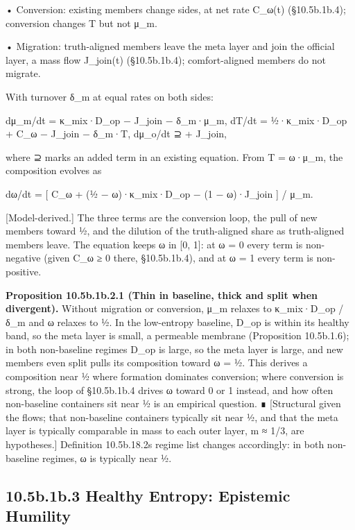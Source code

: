 \documentclass[
]{article}
\begin{document}
• Conversion: existing members change sides, at net rate C\_ω(t)
(§10.5b.1b.4); conversion changes T but not μ\_m.

• Migration: truth-aligned members leave the meta layer and join the
official layer, a mass flow J\_join(t) (§10.5b.1b.4); comfort-aligned
members do not migrate.

With turnover δ\_m at equal rates on both sides:

dμ\_m/dt = κ\_mix·D\_op − J\_join − δ\_m·μ\_m, dT/dt = ½·κ\_mix·D\_op +
C\_ω − J\_join − δ\_m·T, dμ\_o/dt ⊇ + J\_join,

where ⊇ marks an added term in an existing equation. From T = ω·μ\_m,
the composition evolves as

dω/dt = {[} C\_ω + (½ − ω)·κ\_mix·D\_op − (1 − ω)·J\_join {]} / μ\_m.

{[}Model-derived.{]} The three terms are the conversion loop, the pull
of new members toward ½, and the dilution of the truth-aligned share as
truth-aligned members leave. The equation keeps ω in {[}0, 1{]}: at ω =
0 every term is non-negative (given C\_ω ≥ 0 there, §10.5b.1b.4), and at
ω = 1 every term is non-positive.

\textbf{Proposition 10.5b.1b.2.1 (Thin in baseline, thick and split when
divergent).} Without migration or conversion, μ\_m relaxes to
κ\_mix·D\_op / δ\_m and ω relaxes to ½. In the low-entropy baseline,
D\_op is within its healthy band, so the meta layer is small, a
permeable membrane (Proposition 10.5b.1.6); in both non-baseline regimes
D\_op is large, so the meta layer is large, and new
members\textquotesingle{} even split pulls its composition toward ω = ½.
This derives a composition near ½ where formation dominates conversion;
where conversion is strong, the loop of §10.5b.1b.4 drives ω toward 0 or
1 instead, and how often non-baseline containers sit near ½ is an
empirical question. ∎ {[}Structural given the flows; that non-baseline
containers typically sit near ½, and that the meta layer is typically
comparable in mass to each outer layer, m ≈ 1/3, are hypotheses.{]}
Definition 10.5b.18.2\textquotesingle s regime list changes accordingly:
in both non-baseline regimes, ω is typically near ½.

\hypertarget{b.1b.3-healthy-entropy-epistemic-humility}{%
\subsection{10.5b.1b.3 Healthy Entropy: Epistemic
Humility}\label{b.1b.3-healthy-entropy-epistemic-humility}}
\end{document}
